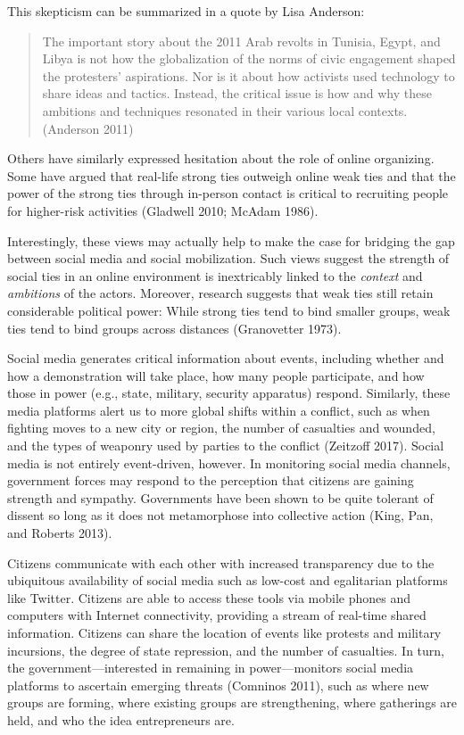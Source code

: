 \documentclass[
  english,
  man]{apa6}
\begin{document}
This skepticism can be summarized in a quote by Lisa Anderson:

\begin{quote}
The important story about the 2011
Arab revolts in Tunisia, Egypt, and Libya is not how the globalization of the
norms of civic engagement shaped the protesters' aspirations. Nor is it about
how activists used technology to share ideas and tactics. Instead, the critical
issue is how and why these ambitions and techniques resonated in their various
local contexts. (Anderson 2011)
\end{quote}

\noindent Others have similarly expressed hesitation about the role of online
organizing. Some have argued that real-life strong ties outweigh online weak ties and
that the power of the strong ties through in-person contact is critical
to recruiting people for higher-risk activities
(Gladwell 2010; McAdam 1986).

Interestingly, these views may
actually help to make the case for bridging the gap between social media and
social mobilization. Such views suggest the strength of social ties in an online
environment is inextricably linked to the \emph{context} and \emph{ambitions} of the actors.
Moreover, research suggests that weak ties still retain considerable political
power: While strong ties tend to bind smaller groups, weak ties
tend to bind groups across distances (Granovetter 1973).

Social media generates critical information about events, including whether and
how a demonstration will take place, how many people participate, and how those
in power (e.g., state, military, security apparatus) respond. Similarly, these
media platforms alert us to more global shifts within a conflict, such as when
fighting moves to a new city or region, the number of casualties and wounded,
and the types of weaponry used by parties to the conflict (Zeitzoff 2017).
Social media is not entirely event-driven, however. In monitoring social media
channels, government forces may respond to the perception that citizens are
gaining strength and sympathy. Governments have been shown to be quite tolerant
of dissent so long as it does not metamorphose into collective action
(King, Pan, and Roberts 2013).

Citizens communicate with each other with increased transparency due to the
ubiquitous availability of social media such as low-cost and egalitarian
platforms like Twitter. Citizens are able to access these tools via mobile
phones and computers with Internet connectivity, providing a stream of real-time
shared information. Citizens can share the location of events like protests and
military incursions, the degree of state repression, and the number of
casualties. In turn, the government---interested in remaining in
power---monitors social media platforms to ascertain emerging threats
(Comninos 2011), such as where new groups are forming, where existing
groups are strengthening, where gatherings are held, and who the idea
entrepreneurs are.
\end{document}
